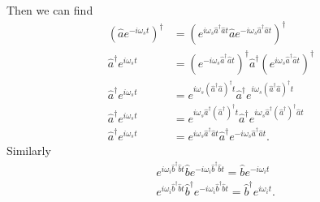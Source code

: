 \documentclass[aps,pra,showpacs,amsmath,amssymb,nofootinbib,longbibliography,superscriptaddress
]{revtex4-1}
\theoremstyle{definition}
\theoremstyle{remark}
\newcommand{\0}{\hat{0}}
\begin{document}
Then we can find
\begin{align}
    {(\hat{a} e^{-i \omega_s t})}^{\dagger}
    &= 
    {(e^{i\omega_s \hat{a}^{\dagger} \hat{a}t} \hat{a} e^{-i\omega_s \hat{a}^{\dagger} \hat{a}t})}^{\dagger} 
    \nonumber \\
    \hat{a}^{\dagger} e^{i \omega_s t} 
    &=
    \left(e^{-i\omega_s \hat{a}^{\dagger} \hat{a}t}\right)^{\dagger} \hat{a}^{\dagger} \left(e^{i\omega_s \hat{a}^{\dagger} \hat{a}t}\right)^{\dagger} 
    \nonumber \\
    \hat{a}^{\dagger} e^{i \omega_s t}
    &=
    e^{i\omega_s \left(\hat{a}^{\dagger} \hat{a}\right)^{\dagger}t} \hat{a}^{\dagger} e^{i\omega_s \left(\hat{a}^{\dagger} \hat{a}\right)^{\dagger}t}
    \nonumber \\
    \hat{a}^{\dagger} e^{i \omega_s t}
    &=
    e^{i\omega_s \hat{a}^{\dagger} \left(\hat{a}^{\dagger} \right)^{\dagger} t} \hat{a}^{\dagger} e^{i\omega_s \hat{a}^{\dagger} \left(\hat{a}^{\dagger} \right)^{\dagger} \hat{a} t}  \nonumber \\
    \hat{a}^{\dagger} e^{i \omega_s t}
    &=
    e^{i\omega_s \hat{a}^{\dagger} \hat{a}t} \hat{a}^{\dagger} e^{-i\omega_s \hat{a}^{\dagger} \hat{a}t}.
\end{align}
Similarly
\begin{align}
    &e^{i\omega_i \hat{b}^{\dagger} \hat{b}t} \hat{b} e^{-i\omega_i \hat{b}^{\dagger} \hat{b}t} = \hat{b} e^{-i \omega_i t}\\
    &e^{i\omega_i \hat{b}^{\dagger} \hat{b}t} \hat{b}^{\dagger} e^{-i\omega_i \hat{b}^{\dagger} \hat{b}t} = \hat{b}^{\dagger} e^{i \omega_i t}.
\end{align}
\end{document}
